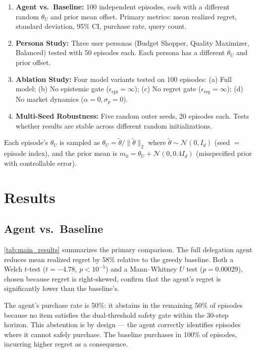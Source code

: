 \documentclass[11pt,letterpaper]{article}
\newcommand{\thetaU}{\theta_U}
\newcommand{\epsreg}{\epsilon_{\mathrm{reg}}}
\newcommand{\epsepi}{\epsilon_{\mathrm{epi}}}
\begin{document}
\begin{enumerate}
    \item \textbf{Agent vs.\ Baseline:} 100 independent episodes, each with a different random $\thetaU$ and prior mean offset.  Primary metrics: mean realized regret, standard deviation, 95\% CI, purchase rate, query count.
    \item \textbf{Persona Study:} Three user personas (Budget Shopper, Quality Maximizer, Balanced) tested with 50 episodes each.  Each persona has a different $\thetaU$ and prior offset.
    \item \textbf{Ablation Study:} Four model variants tested on 100 episodes: (a) Full model; (b) No epistemic gate ($\epsepi = \infty$); (c) No regret gate ($\epsreg = \infty$); (d) No market dynamics ($\alpha = 0, \sigma_p = 0$).
    \item \textbf{Multi-Seed Robustness:} Five random outer seeds, 20 episodes each.  Tests whether results are stable across different random initializations.
\end{enumerate}

Each episode's $\thetaU$ is sampled as $\thetaU = \tilde{\theta}/\|\tilde{\theta}\|_2$ where $\tilde{\theta} \sim \mathcal{N}(0, I_d)$ (seed $=$ episode index), and the prior mean is $m_0 = \thetaU + \mathcal{N}(0, 0.4 I_d)$ (misspecified prior with controllable error).

\section{Results}
\label{sec:results}

\subsection{Agent vs.\ Baseline}
\label{sec:results_main}

\cref{tab:main_results} summarizes the primary comparison.  The full delegation agent reduces mean realized regret by 58\% relative to the greedy baseline.  Both a Welch $t$-test ($t = -4.78$, $p < 10^{-5}$) and a Mann--Whitney $U$ test ($p = 0.00029$), chosen because regret is right-skewed, confirm that the agent's regret is significantly lower than the baseline's.  

The agent's purchase rate is 50\%: it abstains in the remaining 50\% of episodes because no item satisfies the dual-threshold safety gate within the 30-step horizon.  This abstention is by design --- the agent correctly identifies episodes where it cannot safely purchase.  The baseline purchases in 100\% of episodes, incurring higher regret as a consequence.
\end{document}
